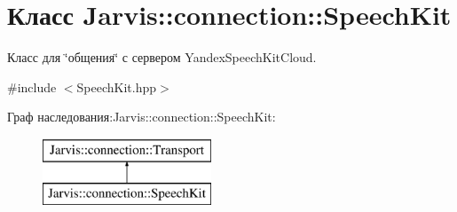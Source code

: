 \hypertarget{classJarvis_1_1connection_1_1SpeechKit}{}\section{Класс Jarvis\+:\+:connection\+:\+:Speech\+Kit}
\label{classJarvis_1_1connection_1_1SpeechKit}


Класс для \char`\"{}общения\char`\"{} с сервером Yandex\+Speech\+Kit\+Cloud.  




{\ttfamily \#include $<$Speech\+Kit.\+hpp$>$}

Граф наследования\+:Jarvis\+:\+:connection\+:\+:Speech\+Kit\+:\begin{figure}[H]
\begin{center}
\leavevmode
\includegraphics[height=2.000000cm]{classJarvis_1_1connection_1_1SpeechKit}
\end{center}
\end{figure}
